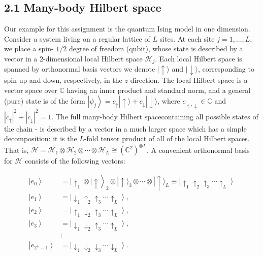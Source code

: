 \documentclass[10pt]{article}
\begin{document}
\subsection*{2.1 Many-body Hilbert space}
Our example for this assignment is the quantum Ising model in one dimension. Consider a system living on a regular lattice of $L$ sites. At each site $j=1, \ldots, L$, we place a spin- $1 / 2$ degree of freedom (qubit), whose state is described by a vector in a 2-dimensional local Hilbert space $\mathcal{H}_{j}$. Each local Hilbert space is spanned by orthonormal basis vectors we denote $|\uparrow\rangle$ and $|\downarrow\rangle$, corresponding to spin up and down, respectively, in the $z$ direction. The local Hilbert space is a vector space over $\mathbb{C}$ having an inner product and standard norm, and a general (pure) state is of the form $\left|\psi_{j}\right\rangle=c_{\uparrow}|\uparrow\rangle+c_{\downarrow}|\downarrow\rangle$, where $c_{\uparrow, \downarrow} \in \mathbb{C}$ and $\left|c_{\uparrow}\right|^{2}+\left|c_{\downarrow}\right|^{2}=1$. The full many-body Hilbert spacecontaining all possible states of the chain - is described by a vector in a much larger space which has a simple decomposition: it is the $L$-fold tensor product of all of the local Hilbert spaces. That is, $\mathcal{H}=\mathcal{H}_{1} \otimes \mathcal{H}_{2} \otimes \cdots \otimes \mathcal{H}_{L} \cong\left(\mathbb{C}^{2}\right)^{\otimes L}$. A convenient orthonormal basis for $\mathcal{H}$ consists of the following vectors:


\begin{align*}
\left|e_{0}\right\rangle & \left.=\left|\uparrow_{1} \otimes\right| \uparrow\right\rangle_{2} \otimes|\uparrow\rangle_{3} \otimes \cdots \otimes|\uparrow\rangle_{L} \equiv\left|\uparrow_{1} \uparrow_{2} \uparrow_{3} \cdots \uparrow_{L}\right\rangle \\
\left|e_{1}\right\rangle & =\left|\downarrow_{1} \uparrow_{2} \uparrow_{3} \cdots \uparrow_{L}\right\rangle, \\
\left|e_{2}\right\rangle & =\left|\uparrow_{1} \downarrow_{2} \uparrow_{3} \cdots \uparrow_{L}\right\rangle,  \tag{1}\\
\left|e_{3}\right\rangle & =\left|\downarrow_{1} \downarrow_{2} \uparrow_{3} \cdots \uparrow_{L}\right\rangle, \\
& \vdots \\
\left|e_{2^{L}-1}\right\rangle & =\left|\downarrow_{1} \downarrow_{2} \downarrow_{3} \cdots \downarrow_{L}\right\rangle .
\end{align*}
\end{document}
